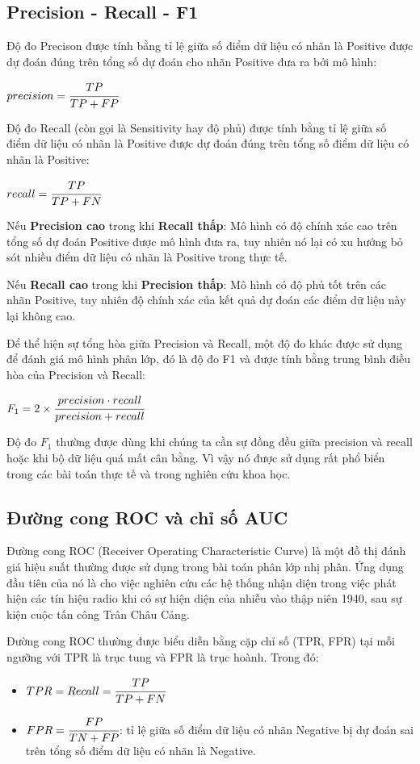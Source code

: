\documentclass[12pt,a4paper,oneside]{book}
\begin{document}
	\subsection{Precision - Recall - F1}
	Độ đo Precison được tính bằng tỉ lệ giữa số điểm dữ liệu có nhãn là Positive được dự đoán đúng trên tổng số dự đoán cho nhãn Positive đưa ra bởi mô hình:
	
	\centerline{$precision = \cfrac{TP}{TP+FP}$}
	\vspace{1em}
	Độ đo Recall (còn gọi là Sensitivity hay độ phủ) được tính bằng tỉ lệ giữa số điểm dữ liệu có nhãn là Positive được dự đoán đúng trên tổng số điểm dữ liệu có nhãn là Positive:
		
	\centerline{$recall = \cfrac{TP}{TP+FN}$}
	\vspace{1em}
	
	Nếu \textbf{Precision cao} trong khi \textbf{Recall thấp}: Mô hình có độ chính xác cao trên tổng số dự đoán Positive được mô hình đưa ra, tuy nhiên nó lại có xu hướng bỏ sót nhiều điểm dữ liệu có nhãn là Positive trong thực tế.
	
	Nếu \textbf{Recall cao} trong khi \textbf{Precision thấp}: Mô hình có độ phủ tốt trên các nhãn Positive, tuy nhiên độ chính xác của kết quả dự đoán các điểm dữ liệu này lại không cao.
	
	Để thể hiện sự tổng hòa giữa Precision và Recall, một độ đo khác được sử dụng để đánh giá mô hình phân lớp, đó là độ đo F1 và được tính bằng trung bình điều hòa của Precision và Recall:  
	
	\centerline{$F_1 = 2 \times \cfrac{precision\cdot recall}{precision+recall}$}
	\vspace{1em}
	Độ đo $F_1$ thường được dùng khi chúng ta cần sự đồng đều giữa precision và recall hoặc khi bộ dữ liệu quá mất cân bằng. Vì vậy nó được sử dụng rất phổ biển trong các bài toán thực tế và trong nghiên cứu khoa học.
	
	\subsection{Đường cong ROC và chỉ số AUC}
	Đường cong ROC (Receiver Operating Characteristic Curve) là một đồ thị đánh giá hiệu suất thường được sử dụng trong bài toán phân lớp nhị phân. Ứng dụng đầu tiên của nó là cho việc nghiên cứu các hệ thống nhận diện trong việc phát hiện các tín hiệu radio khi có sự hiện diện của nhiễu vào thập niên 1940, sau sự kiện cuộc tấn công Trân Châu Cảng. 
	
	Đường cong ROC thường được biểu diễn bằng cặp chỉ số (TPR, FPR) tại mỗi ngưỡng với TPR là trục tung và FPR là trục hoành. Trong đó:
	\begin{itemize}
	\item $TPR = Recall = \cfrac{TP}{TP+FN}$
	\item $FPR = \cfrac{FP}{TN+FP}\vspace{1em}$: tỉ lệ giữa số điểm dữ liệu có nhãn Negative bị dự đoán sai trên tổng số điểm dữ liệu có nhãn là Negative.
	\end{itemize}
	
\end{document}
